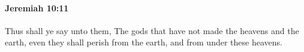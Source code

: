
		\paragraph{Jeremiah 10:11} %
			\label{JEREMIAH-10-11}

			Thus shall ye say unto them, The gods that have not made the heavens and the earth, even they shall perish from the earth, and from under these heavens.


